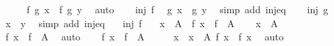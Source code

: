 \begin{isabellebody}
\begin{exercise}[subtitle=Svojstva funkcija]
\ \ \isamarkupfalse%
\ \isamarkupfalse%
\ {\isachardoublequoteopen}f\ {\isacharparenleft}{\kern0pt}g\ x{\isacharparenright}{\kern0pt}\ {\isacharequal}{\kern0pt}\ f\ {\isacharparenleft}{\kern0pt}g\ y{\isacharparenright}{\kern0pt}{\isachardoublequoteclose}\ \isamarkupfalse%
\ auto\isanewline
\ \ \isamarkupfalse%
\ {\isacartoucheopen}inj\ f{\isacartoucheclose}\ \isamarkupfalse%
\ {\isachardoublequoteopen}g\ x\ {\isacharequal}{\kern0pt}\ g\ y{\isachardoublequoteclose}\ \isamarkupfalse%
\ {\isacharparenleft}{\kern0pt}simp\ add{\isacharcolon}{\kern0pt}\ inj{\isacharunderscore}{\kern0pt}eq{\isacharparenright}{\kern0pt}\isanewline
\ \ \isamarkupfalse%
\ {\isacartoucheopen}inj\ g{\isacartoucheclose}\ \isamarkupfalse%
\ {\isachardoublequoteopen}x\ {\isacharequal}{\kern0pt}\ y{\isachardoublequoteclose}\ \isamarkupfalse%
\ {\isacharparenleft}{\kern0pt}simp\ add{\isacharcolon}{\kern0pt}\ inj{\isacharunderscore}{\kern0pt}eq{\isacharparenright}{\kern0pt}\isanewline
{}\isamarkupfalse%
%
\endisatagproof
{\isafoldproof}%
%
\isadelimproof
\isanewline
%
\endisadelimproof
\isanewline
{}\isamarkupfalse%
\isanewline
\ \ \ {\isachardoublequoteopen}inj\ f{\isachardoublequoteclose}\isanewline
\ \ \ {\isachardoublequoteopen}x\ {\isasymin}\ A\ {\isasymlongleftrightarrow}\ f\ x\ {\isasymin}\ f\ {\isacharbackquote}{\kern0pt}\ A{\isachardoublequoteclose}\isanewline
%
\isadelimproof
%
\endisadelimproof
%
\isatagproof
{}\isamarkupfalse%
\isanewline
\ \ \isamarkupfalse%
\ {\isachardoublequoteopen}x\ {\isasymin}\ A{\isachardoublequoteclose}\isanewline
\ \ \isamarkupfalse%
\ \isamarkupfalse%
\ {\isachardoublequoteopen}f\ x\ {\isasymin}\ f\ {\isacharbackquote}{\kern0pt}\ A{\isachardoublequoteclose}\ \isamarkupfalse%
\ auto\isanewline
{}\isamarkupfalse%
\isanewline
\ \ \isamarkupfalse%
\ {\isachardoublequoteopen}f\ x\ {\isasymin}\ f\ {\isacharbackquote}{\kern0pt}\ A{\isachardoublequoteclose}\isanewline
\ \ \isamarkupfalse%
\ \isamarkupfalse%
\ x{\isacharprime}{\kern0pt}\ \ {\isachardoublequoteopen}x{\isacharprime}{\kern0pt}\ {\isasymin}\ A{\isachardoublequoteclose}\ {\isachardoublequoteopen}f\ x\ {\isacharequal}{\kern0pt}\ f\ x{\isacharprime}{\kern0pt}{\isachardoublequoteclose}\ \isamarkupfalse%
\ auto\isanewline

\end{exercise}
\end{isabellebody}
